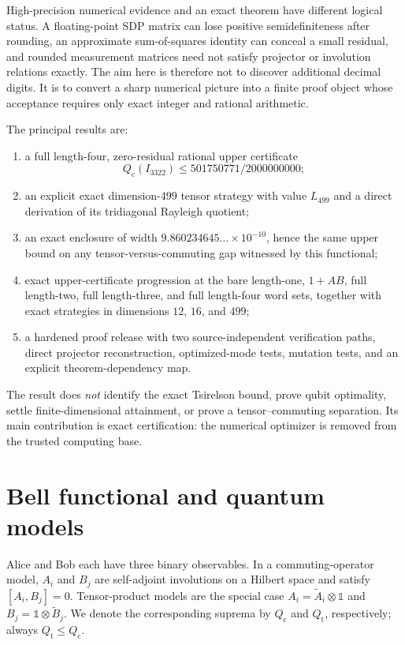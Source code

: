\documentclass[11pt]{article}
\newcommand{\1}{\mathbb{1}}
\newcommand{\Qt}{Q_{\mathrm t}}
\newcommand{\Qc}{Q_{\mathrm c}}
\begin{document}
High-precision numerical evidence and an exact theorem have different logical status.  A floating-point SDP matrix can lose positive semidefiniteness after rounding, an approximate sum-of-squares identity can conceal a small residual, and rounded measurement matrices need not satisfy projector or involution relations exactly.  The aim here is therefore not to discover additional decimal digits.  It is to convert a sharp numerical picture into a finite proof object whose acceptance requires only exact integer and rational arithmetic.

The principal results are:
\begin{enumerate}[label=(\roman*)]
\item a full length-four, zero-residual rational upper certificate
\[
\Qc(I_{3322})\le 501750771/2000000000;
\]
\item an explicit exact dimension-$499$ tensor strategy with value $L_{499}$ and a direct derivation of its tridiagonal Rayleigh quotient;
\item an exact enclosure of width $9.860234645\ldots\times10^{-10}$, hence the same upper bound on any tensor-versus-commuting gap witnessed by this functional;
\item exact upper-certificate progression at the bare length-one, $1{+}AB$, full length-two, full length-three, and full length-four word sets, together with exact strategies in dimensions $12$, $16$, and $499$;
\item a hardened proof release with two source-independent verification paths, direct projector reconstruction, optimized-mode tests, mutation tests, and an explicit theorem-dependency map.
\end{enumerate}

The result does \emph{not} identify the exact Tsirelson bound, prove qubit optimality, settle finite-dimensional attainment, or prove a tensor--commuting separation.  Its main contribution is exact certification: the numerical optimizer is removed from the trusted computing base.

\section{Bell functional and quantum models}\label{sec:models}
Alice and Bob each have three binary observables.  In a commuting-operator model, $A_i$ and $B_j$ are self-adjoint involutions on a Hilbert space and satisfy $[A_i,B_j]=0$.  Tensor-product models are the special case $A_i=\widetilde A_i\otimes\1$ and $B_j=\1\otimes\widetilde B_j$.  We denote the corresponding suprema by $\Qc$ and $\Qt$, respectively; always $\Qt\le\Qc$.
\end{document}

